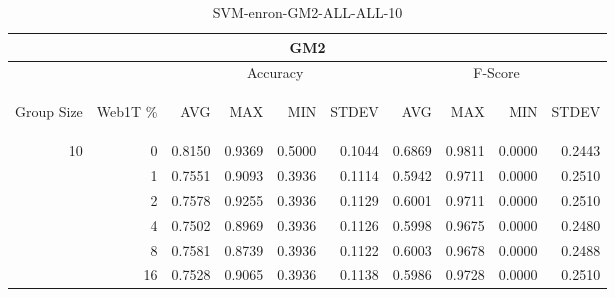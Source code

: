 \begin{center}
\begin{table}[htbp] 
 \begin{center}
\begin{tabular}{ | r | r | r | r | r | r | r | r | r | r |}
\hline
\multicolumn{10}{|c|}{GM2}\\
\hline
 & & \multicolumn{4}{|c|}{Accuracy} & \multicolumn{4}{|c|}{F-Score}\\ \cline{3-10}
\begin{sideways}Group Size\end{sideways} & \begin{sideways}Web1T \%\end{sideways} & \begin{sideways}AVG\end{sideways} & \begin{sideways}MAX\end{sideways} & \begin{sideways}MIN\end{sideways} & \begin{sideways}STDEV\end{sideways} & \begin{sideways}AVG\end{sideways} & \begin{sideways}MAX\end{sideways} & \begin{sideways}MIN\end{sideways} & \begin{sideways}STDEV\end{sideways}\\
\hline
\multirow{5}{*}{10}
 & 0 & 0.8150 & 0.9369 & 0.5000 & 0.1044 & 0.6869 & 0.9811 & 0.0000 & 0.2443\\ \cline{2-10}
 & 1 & 0.7551 & 0.9093 & 0.3936 & 0.1114 & 0.5942 & 0.9711 & 0.0000 & 0.2510\\ \cline{2-10}
 & 2 & 0.7578 & 0.9255 & 0.3936 & 0.1129 & 0.6001 & 0.9711 & 0.0000 & 0.2510\\ \cline{2-10}
 & 4 & 0.7502 & 0.8969 & 0.3936 & 0.1126 & 0.5998 & 0.9675 & 0.0000 & 0.2480\\ \cline{2-10}
 & 8 & 0.7581 & 0.8739 & 0.3936 & 0.1122 & 0.6003 & 0.9678 & 0.0000 & 0.2488\\ \cline{2-10}
 & 16 & 0.7528 & 0.9065 & 0.3936 & 0.1138 & 0.5986 & 0.9728 & 0.0000 & 0.2510\\ \cline{2-10}
\hline
\end{tabular}
\caption{SVM-enron-GM2-ALL-ALL-10}
\label{table:SVM-enron-GM2-ALL-ALL-10}
\end{center}
 \end{table}
\end{center}

